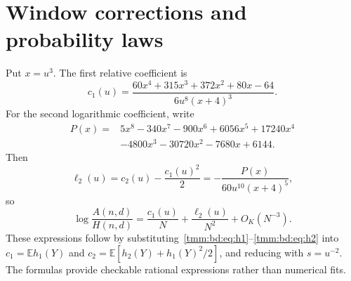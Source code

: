 \documentclass[11pt,letterpaper]{article}
\theoremstyle{remark}\newtheorem{remark}[theorem]{Remark}
\newcommand{\E}{\mathbb E}\newcommand{\Pp}{\mathbb P}
\begin{document}
\section{Window corrections and probability laws}\label{tmm:bd:sec:windowlaws}
Put $x=u^3$. The first relative coefficient is
\begin{equation}\label{tmm:bd:eq:c1window}
 c_1(u)=\frac{60x^4+315x^3+372x^2+80x-64}{6u^8(x+4)^3}.
\end{equation}
For the second logarithmic coefficient, write
\begin{align*}
 P(x)={}&5x^8-340x^7-900x^6+6056x^5+17240x^4\\
        &-4800x^3-30720x^2-7680x+6144.
\end{align*}
Then
\begin{equation}\label{tmm:bd:eq:ell2window}
 \ell_2(u)=c_2(u)-\frac{c_1(u)^2}{2}
          =-\frac{P(x)}{60u^{10}(x+4)^5},
\end{equation}
so
\[
 \log\frac{A(n,d)}{H(n,d)}=\frac{c_1(u)}N+\frac{\ell_2(u)}{N^2}
                        +O_K(N^{-3}).
\]
These expressions follow by substituting~\eqref{tmm:bd:eq:h1}--\eqref{tmm:bd:eq:h2} into $c_1=\E h_1(Y)$ and $c_2=\E[h_2(Y)+h_1(Y)^2/2]$, and reducing with $s=u^{-2}$. The formulas provide checkable rational expressions rather than numerical fits.
\end{document}
